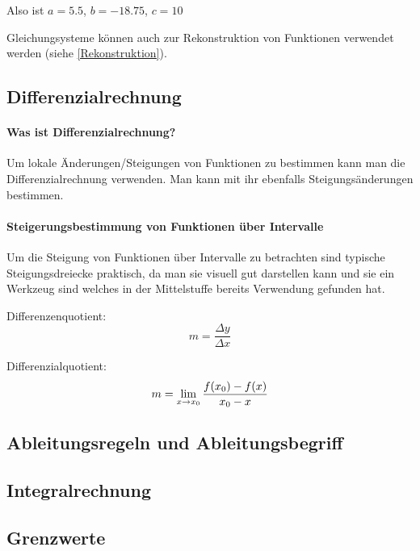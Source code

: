 \documentclass{article}
\begin{document}
			Also ist $a=5.5$, $b=-18.75$, $c=10$
			
			Gleichungsysteme können auch zur Rekonstruktion von Funktionen verwendet werden (siehe \ref{Rekonstruktion}). 

	\subsection{Differenzialrechnung}
		\paragraph{Was ist Differenzialrechnung?}
			Um lokale Änderungen/Steigungen von Funktionen zu bestimmen kann man die Differenzialrechnung verwenden.
			Man kann mit ihr ebenfalls Steigungsänderungen bestimmen.
		\paragraph{Steigerungsbestimmung von Funktionen über Intervalle}

			Um die Steigung von Funktionen über Intervalle zu betrachten sind typische Steigungsdreiecke praktisch,
			da man sie visuell gut darstellen kann und sie ein Werkzeug sind welches in der Mittelstuffe bereits
			Verwendung gefunden hat.
			 
			Differenzenquotient:
			\[
			    m = {\frac {\Delta y} {\Delta x}}
			\]
			
			Differenzialquotient:
			\[
			    m = \lim_{x \to x_{0}} {{f(x_{0}) - f(x)} \over { x_{0} - x}}
			\]



		\paragraph{}

	\subsection{Ableitungsregeln und Ableitungsbegriff}\label{Ableitungen}
	
	\subsection{Integralrechnung}\label{Integralrechnung}

	\subsection{Grenzwerte}
\end{document}
